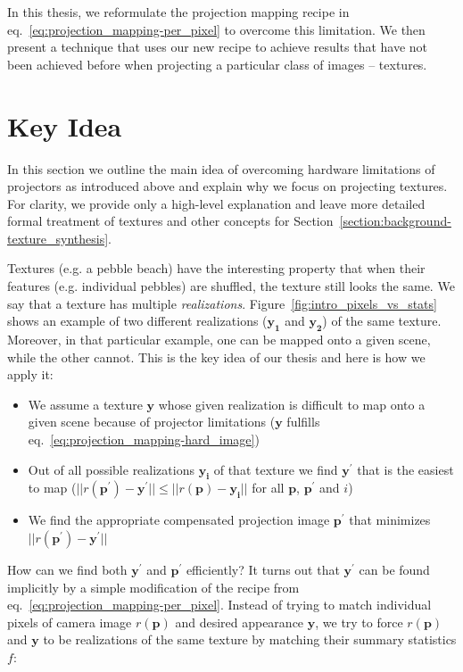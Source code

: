 In this thesis, we reformulate the projection mapping recipe in eq.~\ref{eq:projection_mapping-per_pixel} to overcome this limitation. We then present a technique that uses our new recipe to achieve results that have not been achieved before when projecting a particular class of images -- textures.

\section{Key Idea}
\label{section:intro-key_idea}

In this section we outline the main idea of overcoming hardware limitations of projectors as introduced above and explain why we focus on projecting textures. For clarity, we provide only a high-level explanation and leave more detailed formal treatment of textures and other concepts for Section~\ref{section:background-texture_synthesis}.

Textures (e.g. a pebble beach) have the interesting property that when their features (e.g. individual pebbles) are shuffled, the texture still looks the same. We say that a texture has multiple \textit{realizations}. Figure~\ref{fig:intro_pixels_vs_stats} shows an example of two different realizations (\(\bm{y_1}\) and \(\bm{y_2}\)) of the same texture. Moreover, in that particular example, one can be mapped onto a given scene, while the other cannot. This is the key idea of our thesis and here is how we apply it:

\begin{itemize}
    \item We assume a texture \(\bm{y}\) whose given realization is difficult to map onto a given scene because of projector limitations (\(\bm{y}\) fulfills eq.~\ref{eq:projection_mapping-hard_image}) %
    \item Out of all possible realizations \(\bm{y_i}\) of that texture we find \(\bm{y^\prime}\) that is the easiest to map (\(||r(\bm{p^\prime}) - \bm{y^\prime}|| \leq ||r(\bm{p}) - \bm{y_i}||\) for all \(\bm{p}\), \(\bm{p^\prime}\) and \(i\))
    \item We find the appropriate compensated projection image \(\bm{p^\prime}\) that minimizes \(||r(\bm{p^\prime}) - \bm{y^\prime}||\)
\end{itemize}

How can we find both \(\bm{y^\prime}\) and \(\bm{p^\prime}\) efficiently? It turns out that \(\bm{y^\prime}\) can be found implicitly by a simple modification of the recipe from eq.~\ref{eq:projection_mapping-per_pixel}. Instead of trying to match individual pixels of camera image \(r(\bm{p})\) and desired appearance \(\bm{y}\), we try to force \(r(\bm{p})\) and \(\bm{y}\) to be realizations of the same texture by matching their summary statistics \(f\):

